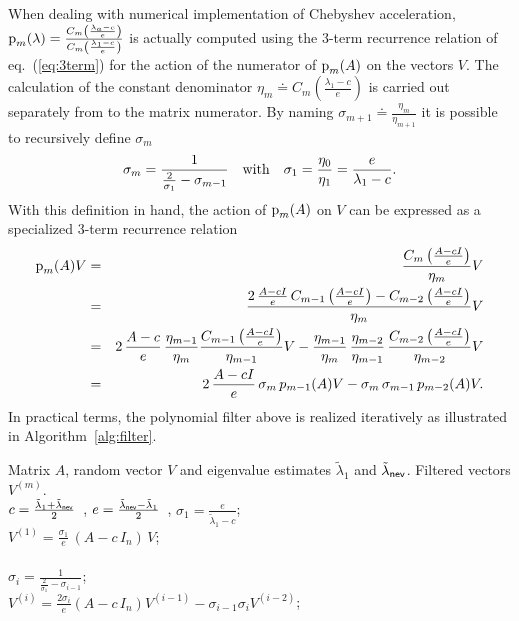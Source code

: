 When dealing with numerical implementation of Chebyshev acceleration,
${\textrm p}_{m}
(\lambda)=\frac{C_m\left(\frac{\lambda_a-c}{e}\right)}{C_m\left(\frac{\lambda_1-c}{e}\right)}$
is actually computed using the 3-term recurrence relation of
eq.~(\ref{eq:3term}) for the action of the numerator of ${\textrm p}_{m} (A)$ on the vectors $V$. The calculation of the constant denominator $\eta_m \doteq C_m(\frac{\lambda_1-c}{e})$ is carried out separately from to the matrix
numerator. By naming $\sigma_{m+1} \doteq \frac{\eta_m}{\eta_{m+1}}$ it is possible to recursively define
$\sigma_{m}$ 
\begin{equation}
\sigma_m  = \frac{1}{\frac{2}{\sigma_1}-\sigma_{m-1}}
\quad {\rm with} \quad
\sigma_1 = \frac{\eta_0}{\eta_1} =\frac{e}{\lambda_1-c}.
\end{equation}
With this definition in hand, the action of ${\textrm p}_{m} (A)$ on $V$ can be expressed as a specialized 3-term recurrence relation 
\begin{eqnarray*}
  {\textrm p}_{m} (A)V &=& \frac{C_{m}\left(\frac{A-cI}{e}\right)}{\eta_{m}}V \\
          &=& \frac{2\, \frac{A-cI}{e}\,C_{m-1}\left(\frac{A-cI}{e}\right)-
              C_{m-2}\left(\frac{A-cI}{e}\right)}{\eta_{m}} V\\
          &=& 2 \, \frac{A-c}{e}\, \frac{\eta_{m-1}}{\eta_{m}} 
               \frac{C_{m-1}\left(\frac{A-cI}{e}\right)}{\eta_{m-1}}V  - 
               \frac{\eta_{m-1}}{\eta_{m}}\,\frac{\eta_{m-2}}{\eta_{m-1}}\, 
               \frac{C_{m-2}\left(\frac{A-cI}{e}\right)}{\eta_{m-2}}V \\
          &=& 2 \, \frac{A-cI}{e}\, \sigma_{m} \, p_{m-1}(A)V -
               \sigma_{m}\, \sigma_{m-1} \, p_{m-2}(A)V.
\end{eqnarray*}
In practical terms, the polynomial filter above is realized iteratively as illustrated in Algorithm~\ref{alg:filter}.
\begin{algorithm}
\caption{Chebyshev polynomial filter}
\begin{algorithmic}
\Require Matrix $A$, random vector $V$ and eigenvalue estimates $\tilde{\lambda}_1$ and $\tilde{\lambda}_{\sf nev}$.
\Ensure Filtered vectors $V^{(m)}$.\\
\State $c=\frac{\tilde{\lambda}_1+\tilde{\lambda}_{\sf nev}}{2}$\ ,  $e = \frac{\tilde{\lambda}_{\sf nev}-\tilde{\lambda}_1}{2}$\ , $\sigma_1 = \frac{e}{\tilde{\lambda}_1-c}$;\\
\State $V^{(1)} = \frac{\sigma_1}{e}\, (A - c\, I_n)\, V$;\\
\\
\State $\sigma_i= \frac{1}{\frac{2}{\sigma_1}-\sigma_{i-1}}$;\\
\State $V^{(i)}=\frac{2\sigma_{i}}{e}\left(A-c\, I_n\right)V^{(i-1)}-\sigma_{i-1}\sigma_{i}V^{(i-2)}$;\\
\EndFor
\end{algorithmic}
\label{alg:filter}
\end{algorithm}

